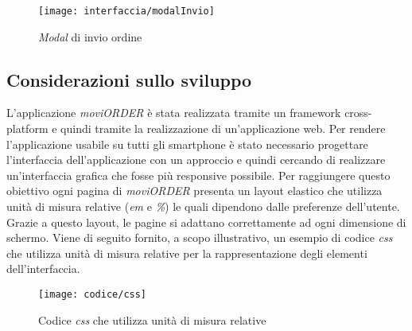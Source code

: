 \begin{figure}[!h] 
    \centering 
    \texttt{[image: interfaccia/modalInvio]} 
    \caption{\textit{Modal} di invio ordine}
\end{figure}

\subsection{Considerazioni sullo sviluppo}

L'applicazione \textit{moviORDER} è stata realizzata tramite un framework cross-platform e quindi tramite la realizzazione di un'applicazione web. Per rendere l'applicazione usabile su tutti gli smartphone è stato necessario progettare l'interfaccia dell'applicazione con un approccio  e quindi cercando di realizzare un'interfaccia grafica che fosse più responsive possibile. Per raggiungere questo obiettivo ogni pagina di \textit{moviORDER} presenta un layout elastico che utilizza unità di misura relative (\textit{em} e \textit{\%}) le quali dipendono dalle preferenze dell'utente. Grazie a questo layout, le pagine si adattano correttamente ad ogni dimensione di schermo. Viene di seguito fornito, a scopo illustrativo, un esempio di codice \textit{css} che utilizza unità di misura relative per la rappresentazione degli elementi dell'interfaccia.

\begin{figure}[!h] 
    \centering 
    \texttt{[image: codice/css]} 
    \caption{Codice \textit{css} che utilizza unità di misura relative}
\end{figure}